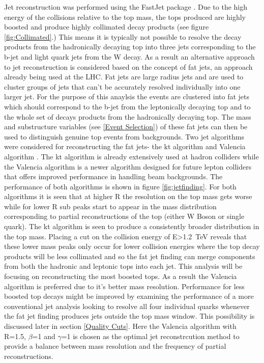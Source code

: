 Jet reconstruction was performed using the FastJet package \cite{Cacciari:2011ma}. Due to the high energy of the collisions relative to the top mass, the tops produced are highly boosted and produce highly collimated decay products (see figure \ref{fig:Collimated}.) This means it is typically not possible to resolve the decay products from the hadronically decaying top into three jets corresponding to the b-jet and light quark jets from the W decay. As a result an alternative approach to jet reconstruction is considered based on the concept of fat jets, an approach already being used at the LHC\cite{Miller:2011qg}. Fat jets are large radius jets and are used to cluster groups of jets that can't be accurately resolved individually into one larger jet. For the purpose of this anaylsis the events are clustered into fat jets which should correspond to the b-jet from the leptonically decaying top and to the whole set of decays products from the hadronically decaying top. The mass and substructure variables (see \ref{Event Selection}) of these fat jets can then be used to distinguish genuine top events from backgrounds. Two jet algorithms were considered for reconstructing the fat jets- the kt algorithm \cite{Cacciari:2008gp} and Valencia algorithm \cite{Boronat:2014hva}. The kt algorithm is already extensively used at hadron colliders while the Valencia algorithm is a newer algorithm designed for future lepton colliders that offers improved performance in handling beam backgrounds. The performance of both algorithms is shown in figure \ref{fig:jetfinding}. For both algorithms it is seen that at higher R the resolution on the top mass gets worse while for lower R sub peaks start to appear in the mass distribution corresponding to partial reconstructions of the top (either W Boson or single quark). The kt algorithm is seen to produce a consistently broader distribution in the top mass. Placing a cut on the collision energy of E>1.2~TeV reveals that these lower mass peaks only occur for lower collision energies where the top decay products will be less collimated and so the fat jet finding can merge components from both the hadronic and leptonic tops into each jet. This analysis will be focusing on reconstructing the most boosted tops. As a result the Valencia algorithm is preferred due to it's better mass resolution. Performance for less boosted top decays might be improved by examining the performance of a more conventional jet analysis looking to resolve all four individual quarks whenever the fat jet finding produces jets outside the top mass window. This possibility is discussed later in section \ref{Quality Cuts}. Here the Valencia algorithm with R=1.5, $\beta$=1 and $\gamma$=1 is chosen as the optimal jet reconstrcution method to provide a balance between mass resolution and the frequency of partial reconstructions. 

